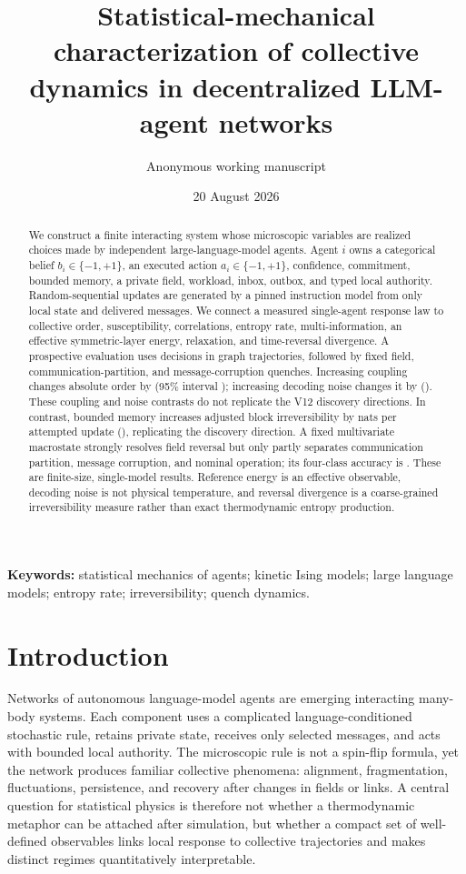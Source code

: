 \documentclass[12pt]{article}
\title{Statistical-mechanical characterization of collective dynamics in decentralized LLM-agent networks}
\author{Anonymous working manuscript}
\date{20 August 2026}
\begin{document}
\maketitle

\begin{abstract}
We construct a finite interacting system whose microscopic variables are
realized choices made by independent large-language-model agents. Agent $i$
owns a categorical belief $b_i\in\{-1,+1\}$, an executed action
$a_i\in\{-1,+1\}$, confidence, commitment, bounded memory, a private field,
workload, inbox, outbox, and typed local authority. Random-sequential updates
are generated by a pinned instruction model from only local state and delivered
messages. We connect a measured single-agent response law to collective order,
susceptibility, correlations, entropy rate, multi-information, an effective
symmetric-layer energy, relaxation, and time-reversal divergence. A prospective
evaluation uses \VThirteenDecisions{} decisions in
\VThirteenTrajectories{} graph trajectories, followed by fixed field,
communication-partition, and message-corruption quenches. Increasing coupling
changes absolute order by \CouplingOrderEffect{} (95\% interval
\CouplingOrderCI); increasing decoding noise changes it by
\NoiseOrderEffect{} (\NoiseOrderCI). These coupling and noise contrasts do not
replicate the V12 discovery directions. In contrast, bounded memory increases
adjusted block irreversibility by \MemoryIrreversibilityEffect{} nats per
attempted update (\MemoryIrreversibilityCI), replicating the discovery
direction. A fixed multivariate macrostate strongly resolves field reversal but
only partly separates communication partition, message corruption, and nominal
operation; its four-class accuracy is \FullRepresentationAccuracy. These are
finite-size, single-model results.
Reference energy is an effective observable, decoding noise is not physical
temperature, and reversal divergence is a coarse-grained irreversibility
measure rather than exact thermodynamic entropy production.
\end{abstract}

\noindent\textbf{Keywords:} statistical mechanics of agents; kinetic Ising
models; large language models; entropy rate; irreversibility; quench dynamics.

\section{Introduction}

Networks of autonomous language-model agents are emerging interacting
many-body systems. Each component uses a complicated language-conditioned
stochastic rule, retains private state, receives only selected messages, and
acts with bounded local authority. The microscopic rule is not a spin-flip
formula, yet the network produces familiar collective phenomena: alignment,
fragmentation, fluctuations, persistence, and recovery after changes in fields
or links. A central question for statistical physics is therefore not whether a
thermodynamic metaphor can be attached after simulation, but whether a compact
set of well-defined observables links local response to collective trajectories
and makes distinct regimes quantitatively interpretable.
\end{document}
